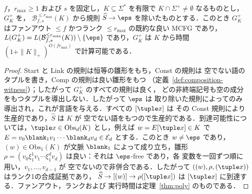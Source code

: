 \begin{lemma}[既約な良い仮説]
\label{lem:reduced-good-hypothesis}
$f$，$r_{\max}\ge1$ および $s$ を固定し，$K\subseteq\Sigma^*$ を有限で
$K\cap\Sigma^+\ne\emptyset$ なるものとし，$G^+_K$ を，
$\mathcal B^{\le r_{\max}}_{f,s}(K)$ から規則 $\widehat S\to\eps$ を除いたものとする．このとき
$G^+_K$ はファンアウト $\le f$ かつランク $\le r_{\max}$ の既約な良い MCFG であり，
$L(G^+_K)=L(\mathcal B^{\le r_{\max}}_{f,s}(K))\setminus\{\eps\}$ であり，$G^+_K$ は
$K$ から時間 $(1+\|K\|_+)^{O(fr_{\max})}$ で計算可能である．
\end{lemma}

\begin{proof}
Start と Link の規則は恒等の雛形をもち，Const の規則は
空でない語のタプルを書き，Comp の規則は良い雛形をもつ
（定義~\ref{def:composition-witness}）；したがって $G^+_K$ のすべての規則は良く，
どの非終端記号も空の成分をもつタプルを導出しない．したがって $\eps$ は
取り除いた規則によってのみ導出され，これが言語を与える．すべての $[\tuple x]$ は
その Const 規則により生産的であり，$\widehat S$ は $K$ が
空でない語をもつので生産的である．到達可能性については，$\tuple x\in\mathrm{Obs}_d(K)$ とし，例えば
$w=E[\tuple x]\in K$ で $E=v_0\blank_1v_1\cdots\blank_dv_d\in\mathcal E_d$ とする．このとき $w\ne\eps$ であり，
$(w)\in\mathrm{Obs}_1(K)$ が文脈 $\blank_1$ によって成り立ち，雛形
$\rho=(v_0\xi_1^1v_1\cdots\xi_1^dv_d)$ は良い：それは $\eps$-free であり，各
変数を一回ずつ順に用い，$v_1,\ldots,v_{d-1}$ が
空でないので非併合である．したがって $((w),\rho,(\tuple x))$ はランク1の合成証拠であり，
$\widehat S\to[(w)]\to\rho([\tuple x])$ は $[\tuple x]$ に到達する．ファンアウト，ランクおよび
実行時間は定理~\ref{thm:poly} のものである．
\end{proof}

